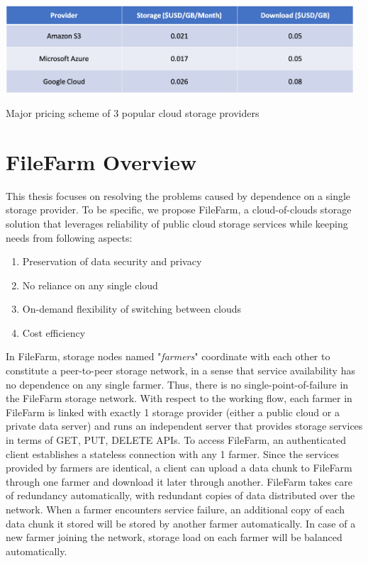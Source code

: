 \begin{table}[!b]
\centering
  \includegraphics[width=13cm]{tables/table_cloud_storage_cost.png}
  \caption{Major pricing scheme of 3 popular cloud storage providers}
  \label{table:cloudstoragecost}
\end{table}

\section{FileFarm Overview}
\label{s:filefarmoverview}
This thesis focuses on resolving the problems caused by dependence on a single storage provider. To be specific, we propose FileFarm, a cloud-of-clouds storage solution that leverages reliability of public cloud storage services while keeping needs from following aspects:

\begin{enumerate}
    \item Preservation of data security and privacy
    \item No reliance on any single cloud
    \item On-demand flexibility of switching between clouds
    \item Cost efficiency
\end{enumerate}

In FileFarm, storage nodes named "\textit{farmers}" coordinate with each other to constitute a peer-to-peer storage network, in a sense that service availability has no dependence on any single farmer. Thus, there is no single-point-of-failure in the FileFarm storage network. With respect to the working flow, each farmer in FileFarm is linked with exactly 1 storage provider (either a public cloud or a private data server) and runs an independent server that provides storage services in terms of GET, PUT, DELETE APIs. To access FileFarm, an authenticated client establishes a stateless connection with any 1 farmer. Since the services provided by farmers are identical, a client can upload a data chunk to FileFarm through one farmer and download it later through another. FileFarm takes care of redundancy automatically, with redundant copies of data distributed over the network. When a farmer encounters service failure, an additional copy of each data chunk it stored will be stored by another farmer automatically. In case of a new farmer joining the network, storage load on each farmer will be balanced automatically.
